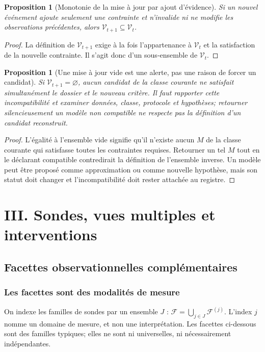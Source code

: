 \documentclass[11pt,oneside]{book}
\newtheorem{proposition}[theoreme]{Proposition}
\theoremstyle{definition}
\theoremstyle{remark}
\newcommand{\Fcal}{\mathcal F}
\newcommand{\1}{\mathbf 1}
\begin{document}
\begin{proposition}[Monotonie de la mise à jour par ajout d'évidence]
Si un nouvel événement ajoute seulement une contrainte et n'invalide ni ne modifie les observations précédentes, alors $\mathcal V_{t+1}\subseteq\mathcal V_t$.
\end{proposition}
\begin{proof}
La définition de $\mathcal V_{t+1}$ exige à la fois l'appartenance à $\mathcal V_t$ et la satisfaction de la nouvelle contrainte. Il s'agit donc d'un sous-ensemble de $\mathcal V_t$.\end{proof}

\begin{proposition}[Une mise à jour vide est une alerte, pas une raison de forcer un candidat]
Si $\mathcal V_{t+1}=\varnothing$, aucun candidat de la classe courante ne satisfait simultanément le dossier et le nouveau critère. Il faut rapporter cette incompatibilité et examiner données, classe, protocole et hypothèses; retourner silencieusement un modèle non compatible ne respecte pas la définition d'un candidat reconstruit.
\end{proposition}
\begin{proof}
L'égalité à l'ensemble vide signifie qu'il n'existe aucun $M$ de la classe courante qui satisfasse toutes les contraintes requises. Retourner un tel $M$ tout en le déclarant compatible contredirait la définition de l'ensemble inverse. Un modèle peut être proposé comme approximation ou comme nouvelle hypothèse, mais son statut doit changer et l'incompatibilité doit rester attachée au registre.\end{proof}

\part{III. Sondes, vues multiples et interventions}

\chapter{Facettes observationnelles complémentaires}
\section{Les facettes sont des modalités de mesure}
On indexe les familles de sondes par un ensemble $J$ : $\Fcal=\bigcup_{j\in J}\Fcal^{(j)}$. L'index $j$ nomme un domaine de mesure, et non une interprétation. Les facettes ci-dessous sont des familles typiques; elles ne sont ni universelles, ni nécessairement indépendantes.
\end{document}
